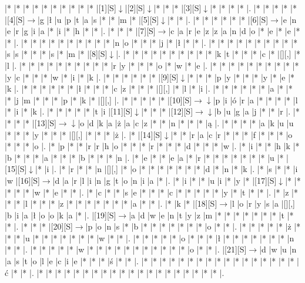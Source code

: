\documentclass[11pt]{article}
\newcommand\drarr{$\rightarrow \!\!\!\!\! \downarrow$}
\newcommand\rarr{$\rightarrow$}
\newcommand\darr{$\downarrow$}
\begin{document}
\noindent\begin{Puzzle}{19}{33}|*	|*	|*	|*	|*	|*	|*	|*	|*	|*	|[1][S]\darr	|[2][S]\darr	|*	|*	|*	|[3][S]\darr	|*	|*	|*	|*	|.
|*	|*	|*	|*	|*	|[4][S]\rarr	|g	|ł	|u	|p	|t	|a	|s	|*	|*	|m	|*	|[5][S]\darr	|*	|*	|.
|*	|*	|*	|*	|*	|*	|[6][S]\rarr	|e	|n	|e	|r	|g	|i	|a	|*	|i	|*	|h	|*	|*	|.
|*	|*	|*	|[7][S]\rarr	|c	|a	|r	|e	|z	|z	|a	|n	|d	|o	|*	|e	|*	|e	|*	|*	|.
|*	|*	|*	|*	|*	|*	|*	|*	|*	|*	|n	|o	|*	|*	|*	|j	|*	|ł	|*	|*	|.
|*	|*	|*	|*	|*	|*	|*	|*	|*	|*	|s	|s	|*	|*	|*	|s	|*	|m	|*	|[8][S]\darr	|.
|*	|*	|*	|*	|*	|*	|*	|*	|*	|*	|k	|t	|*	|*	|*	|c	|*	|[][,]{ }	|*	|l	|.
|*	|*	|*	|*	|*	|*	|*	|*	|*	|*	|r	|y	|*	|*	|*	|o	|*	|w	|*	|e	|.
|*	|*	|*	|*	|*	|*	|*	|*	|*	|*	|y	|c	|*	|*	|*	|w	|*	|i	|*	|k	|.
|*	|*	|*	|*	|*	|*	|[9][S]\darr	|*	|*	|*	|p	|y	|*	|*	|*	|y	|*	|e	|*	|k	|.
|*	|*	|*	|*	|*	|*	|ł	|*	|*	|*	|c	|z	|*	|*	|*	|[][,]{ }	|*	|l	|*	|i	|.
|*	|*	|*	|*	|*	|*	|a	|*	|*	|*	|j	|m	|*	|*	|*	|p	|*	|k	|*	|[][,]{ }	|.
|*	|*	|*	|*	|*	|[10][S]\drarr	|p	|i	|ó	|r	|a	|*	|*	|*	|*	|l	|*	|i	|*	|k	|.
|*	|*	|*	|*	|*	|t	|i	|[11][S]\darr	|*	|*	|*	|[12][S]\drarr	|b	|u	|g	|a	|j	|*	|*	|r	|.
|*	|*	|*	|*	|[13][S]\drarr	|o	|d	|k	|a	|ż	|a	|c	|z	|*	|*	|n	|*	|*	|*	|ą	|.
|*	|*	|*	|*	|a	|k	|u	|u	|*	|*	|*	|y	|*	|*	|*	|[][,]{ }	|*	|*	|*	|ż	|.
|*	|[14][S]\darr	|*	|*	|r	|a	|c	|r	|*	|*	|*	|f	|*	|*	|*	|o	|*	|*	|*	|o	|.
|*	|p	|*	|*	|r	|r	|h	|o	|*	|*	|*	|r	|*	|*	|*	|d	|*	|*	|*	|w	|.
|*	|i	|*	|*	|h	|k	|*	|b	|*	|*	|*	|a	|*	|*	|*	|b	|*	|*	|*	|n	|.
|*	|e	|*	|*	|e	|a	|*	|r	|*	|*	|*	|*	|*	|*	|*	|u	|*	|[15][S]\darr	|*	|i	|.
|*	|r	|*	|*	|n	|[][,]{ }	|*	|o	|*	|*	|*	|*	|*	|*	|*	|d	|*	|n	|*	|k	|.
|*	|s	|*	|*	|i	|w	|[16][S]\rarr	|d	|a	|r	|l	|i	|n	|g	|t	|o	|n	|i	|a	|*	|.
|*	|i	|*	|*	|u	|i	|*	|y	|*	|[17][S]\darr	|*	|*	|*	|*	|*	|w	|*	|e	|*	|*	|.
|*	|c	|*	|*	|s	|e	|*	|*	|*	|c	|*	|*	|*	|*	|*	|y	|*	|t	|*	|*	|.
|*	|z	|*	|*	|*	|l	|*	|*	|*	|z	|*	|*	|*	|*	|*	|*	|*	|a	|*	|*	|.
|*	|k	|*	|[18][S]\rarr	|l	|o	|r	|y	|s	|a	|[][,]{ }	|b	|i	|a	|ł	|o	|o	|k	|a	|*	|.
|[19][S]\rarr	|a	|d	|w	|e	|n	|t	|y	|z	|m	|*	|*	|*	|*	|*	|*	|*	|t	|*	|*	|.
|*	|*	|*	|[20][S]\rarr	|p	|o	|n	|s	|*	|b	|*	|*	|*	|*	|*	|*	|*	|o	|*	|*	|.
|*	|*	|*	|*	|*	|ż	|*	|*	|*	|u	|*	|*	|*	|*	|*	|*	|*	|w	|*	|*	|.
|*	|*	|*	|*	|*	|o	|*	|*	|*	|ł	|*	|*	|*	|*	|*	|*	|*	|n	|*	|*	|.
|*	|*	|*	|*	|*	|w	|*	|*	|*	|*	|*	|*	|*	|*	|*	|*	|*	|o	|*	|*	|.
|[21][S]\rarr	|d	|w	|u	|n	|a	|s	|t	|o	|l	|e	|c	|i	|e	|*	|*	|*	|ś	|*	|*	|.
|*	|*	|*	|*	|*	|*	|*	|*	|*	|*	|*	|*	|*	|*	|*	|*	|*	|ć	|*	|*	|.
|*	|*	|*	|*	|*	|*	|*	|*	|*	|*	|*	|*	|*	|*	|*	|*	|*	|*	|*	|*	|.\end{Puzzle}

\newpage
\end{document}
